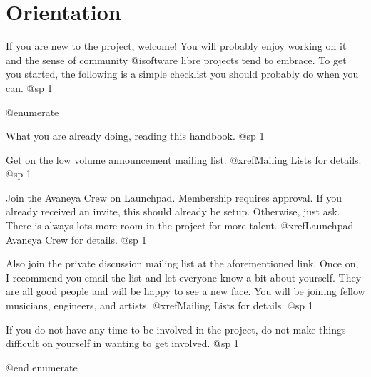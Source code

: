 \section{Orientation}

If you are new to the project, welcome! You will probably enjoy working on it and the sense of community @i{software libre} projects tend to embrace. To get you started, the following is a simple checklist you should probably do when you can.
@sp 1

@enumerate

\item
What you are already doing, reading this handbook.
@sp 1

\item
Get on the low volume announcement mailing list. @xref{Mailing Lists} for details.
@sp 1

\item
Join the Avaneya Crew on Launchpad. Membership requires approval. If you already received an invite, this should already be setup. Otherwise, just ask. There is always lots more room in the project for more talent. @xref{Launchpad Avaneya Crew} for details.
@sp 1

\item
Also join the private discussion mailing list at the aforementioned link. Once on, I recommend you email the list and let everyone know a bit about yourself. They are all good people and will be happy to see a new face. You will be joining fellow musicians, engineers, and artists. @xref{Mailing Lists} for details.
@sp 1

\item
If you do not have any time to be involved in the project, do not make things difficult on yourself in wanting to get involved.
@sp 1

@end enumerate

